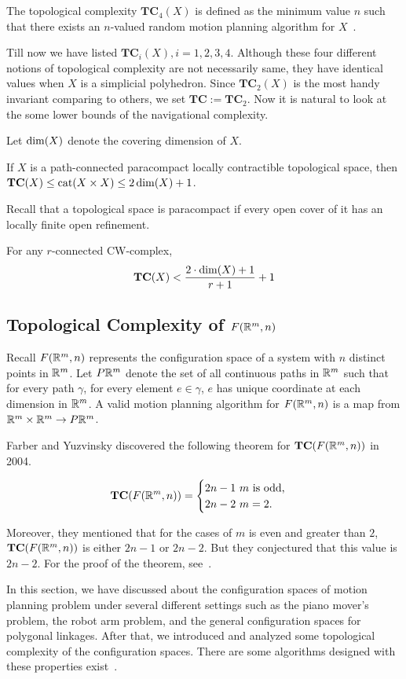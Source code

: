 \begin{definition}
  The topological complexity \(\mathbf{TC}_4(X)\) is defined as the minimum value \(n\) such that there exists an \(n\)-valued random motion planning algorithm for \(X\)~\cite{farber2006topology}.
\end{definition}

Till now we have listed \(\mathbf{TC}_i(X),i=1,2,3,4\). Although these four different notions of topological complexity are not necessarily same, they have identical values when \(X\) is a simplicial polyhedron. Since \(\mathbf{TC}_2(X)\) is the most handy invariant comparing to others, we set \(\mathbf{TC}:=\mathbf{TC}_2\).
Now it is natural to look at the some lower bounds of the navigational complexity.

Let \(\operatorname{dim}(X)\) denote the covering dimension of \(X\).
\begin{theorem}
If \(X\) is a path-connected paracompact locally contractible topological space, then \(\mathbf{TC}(X)\le \operatorname{cat}(X\times X)\le 2\operatorname{dim}(X)+1\).
\end{theorem}
Recall that a topological space is paracompact if every open cover of it has an locally finite open refinement.
\begin{theorem}
  For any \(r\)-connected CW-complex,
  \[\mathbf{TC}(X)<\frac{2\cdot\operatorname{dim}(X)+1}{r+1}+1\]
\end{theorem}

\subsection{Topological Complexity of \(F(\mathbb{R}^m,n)\)}
Recall \(F(\mathbb{R}^m,n)\) represents the configuration space of a system with \(n\) distinct points in \(\mathbb{R}^m\).
Let \(P\mathbb{R}^m\) denote the set of all continuous paths in \(\mathbb{R}^m\) such that for every path \(\gamma\), for every element \(e\in \gamma\), \(e\) has unique coordinate at each dimension in \(\mathbb{R}^m\).
A valid motion planning algorithm for \(F(\mathbb{R}^m,n)\) is a map from \(\mathbb{R}^m\times \mathbb{R}^m\to P\mathbb{R}^m\).

Farber and Yuzvinsky discovered the following theorem for \(\mathbf{TC}(F(\mathbb{R}^m,n))\) in 2004.
\begin{theorem}
  \[\mathbf{TC}(F(\mathbb{R}^m,n))=\begin{cases}
      2n-1 \text{ \(m\) is odd,}\\
      2n-2 \text{ \(m=2\)}.
    \end{cases}\]
\end{theorem}
Moreover, they mentioned that for the cases of \(m\) is even and greater than \(2\), \(\mathbf{TC}(F(\mathbb{R}^m,n))\) is either \(2n-1\) or \(2n-2\). But they conjectured that this value is \(2n-2\). For the proof of the theorem, see~\cite{farber2004topological}.

In this section, we have discussed about the configuration spaces of motion planning problem under several different settings such as the piano mover's problem, the robot arm problem, and the general configuration spaces for polygonal linkages. After that, we introduced and analyzed some topological complexity of the configuration spaces. There are some algorithms designed with these properties exist~\cite{farber2006topology}.